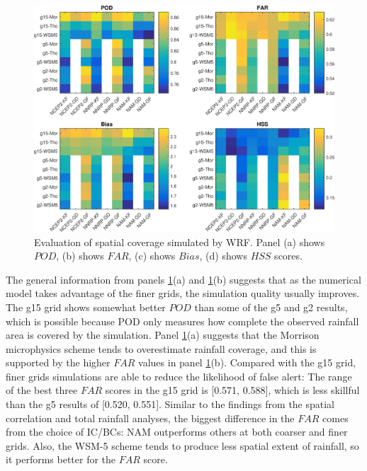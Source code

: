\begin{figure}[htbp]
  \includegraphics[width=\linewidth]{pics/ch2/fig5.jpg}
  \caption{Evaluation of spatial coverage simulated by WRF. Panel (a) shows $POD$, (b) shows $FAR$, (c) shows $Bias$, (d) shows $HSS$ scores.}
  \label{fig:2-5}
\end{figure}

The general information from panels \ref{fig:2-5}(a) and \ref{fig:2-5}(b) suggests that as the numerical model takes advantage of the finer grids, the simulation quality usually improves. The g15 grid shows somewhat better $POD$ than some of the g5 and g2 results, which is possible because POD only measures how complete the observed rainfall area is covered by the simulation. Panel \ref{fig:2-5}(a) suggests that the Morrison microphysics scheme tends to overestimate rainfall coverage, and this is supported by the higher $FAR$ values in panel \ref{fig:2-5}(b). Compared with the g15 grid, finer grids simulations are able to reduce the likelihood of false alert: The range of the best three $FAR$ scores in the g15 grid is [0.571, 0.588], which is less skillful than the g5 results of [0.520, 0.551]. Similar to the findings from the spatial correlation and total rainfall analyses, the biggest difference in the $FAR$ comes from the choice of IC/BCs: NAM outperforms others at both coarser and finer grids. Also, the WSM-5 scheme tends to produce less spatial extent of rainfall, so it performs better for the $FAR$ score.

